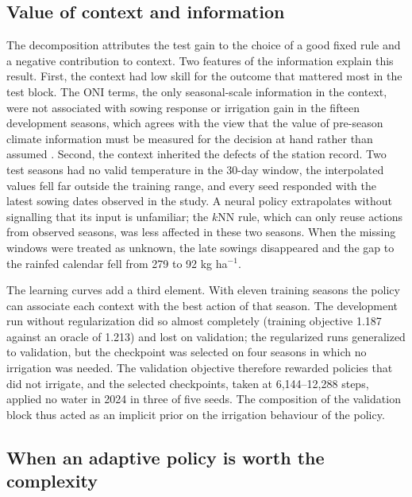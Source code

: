 \documentclass[times,final,authoryear]{elsarticle}
\begin{document}
\subsection{Value of context and information}
\label{subdisc_information}

The decomposition attributes the test gain to the choice of a good fixed rule and a negative contribution to context. Two features of the information explain this result. First, the context had low skill for the outcome that mattered most in the test block. The ONI terms, the only seasonal-scale information in the context, were not associated with sowing response or irrigation gain in the fifteen development seasons, which agrees with the view that the value of pre-season climate information must be measured for the decision at hand rather than assumed \citep{hansen2002climate}. Second, the context inherited the defects of the station record. Two test seasons had no valid temperature in the 30-day window, the interpolated values fell far outside the training range, and every seed responded with the latest sowing dates observed in the study. A neural policy extrapolates without signalling that its input is unfamiliar; the $k$NN rule, which can only reuse actions from observed seasons, was less affected in these two seasons. When the missing windows were treated as unknown, the late sowings disappeared and the gap to the rainfed calendar fell from 279 to 92 kg ha$^{-1}$.

The learning curves add a third element. With eleven training seasons the policy can associate each context with the best action of that season. The development run without regularization did so almost completely (training objective 1.187 against an oracle of 1.213) and lost on validation; the regularized runs generalized to validation, but the checkpoint was selected on four seasons in which no irrigation was needed. The validation objective therefore rewarded policies that did not irrigate, and the selected checkpoints, taken at 6,144--12,288 steps, applied no water in 2024 in three of five seeds. The composition of the validation block thus acted as an implicit prior on the irrigation behaviour of the policy.

\subsection{When an adaptive policy is worth the complexity}
\label{subdisc_value}
\end{document}
